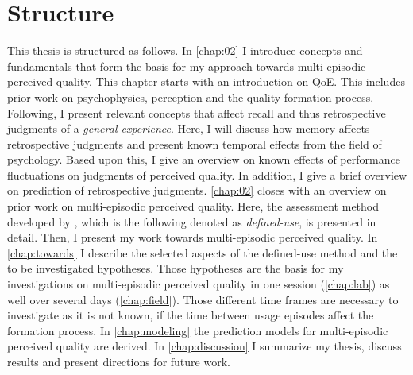 \section{Structure}
This thesis is structured as follows.
In \autoref{chap:02} I introduce concepts and fundamentals that form the basis for my approach towards multi-episodic perceived quality.
This chapter starts with an introduction on \ac{QoE}.
This includes prior work on psychophysics, perception and the quality formation process.
Following, I present relevant concepts that affect recall and thus retrospective judgments of a \emph{general experience}.
Here, I will discuss how memory affects retrospective judgments and present known temporal effects from the field of psychology.
Based upon this, I give an overview on known effects of performance fluctuations on judgments of perceived quality.
In addition, I give a brief overview on prediction of retrospective judgments.
\autoref{chap:02} closes with an overview on prior work on multi-episodic perceived quality.
Here, the assessment method developed by \citet{moller_single-call_2011}, which is the following denoted as \emph{defined-use}, is presented in detail.
Then, I present my work towards multi-episodic perceived quality. %
In \autoref{chap:towards} I describe the selected aspects of the defined-use method and the to be investigated hypotheses.
Those hypotheses are the basis for my investigations on multi-episodic perceived quality in one session (\autoref{chap:lab}) as well over several days (\autoref{chap:field}).
Those different time frames are necessary to investigate as it is not known, if the time between usage episodes affect the formation process.
In \autoref{chap:modeling} the prediction models for multi-episodic perceived quality are derived.
In \autoref{chap:discussion} I summarize my thesis, discuss results and present directions for future work.
